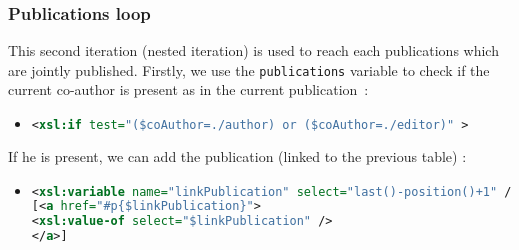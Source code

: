 \documentclass{article}
\begin{document}
    \subsubsection{Publications loop}
    This second iteration (nested iteration) is used to reach each publications which are jointly published. Firstly, we use the \verb|publications| variable to check if the current co-author is present as in the current publication~: 
      \begin{itemize}
	\item \begin{lstlisting}[language=XML]
<xsl:if test="($coAuthor=./author) or ($coAuthor=./editor)" >\end{lstlisting}
      \end{itemize}
      If he is present, we can add the publication (linked to the previous table) :
      \begin{itemize}
	\item \begin{lstlisting}[language=XML]
<xsl:variable name="linkPublication" select="last()-position()+1" />
[<a href="#p{$linkPublication}">
<xsl:value-of select="$linkPublication" />
</a>]\end{lstlisting}
      \end{itemize}
      
      
\end{document}

